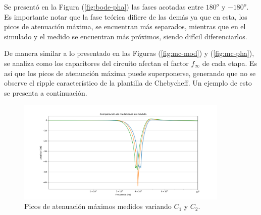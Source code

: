 Se presentó en la Figura (\ref{fig:bode-pha}) las fases acotadas entre $180^o$ y $-180^o$. Es importante notar que la fase teórica difiere de las demás ya que en esta, los picos de atenuación máxima, se encuentran más separados, mientras que en el simulado y el medido se encuentran más próximos, siendo difícil diferenciarlos. 

De manera similar a lo presentado en las Figuras (\ref{fig:mc-mod}) y (\ref{fig:mc-pha}), se analiza como los capacitores del circuito afectan el factor $f_\infty$ de cada etapa. Es así que los picos de atenuación máxima puede superponerse, generando que no se observe el ripple característico de la plantilla de Chebycheff. Un ejemplo de esto se presenta a continuación.
\begin{figure}[H]
\centering
	\includegraphics[width=0.9\textwidth]{ImagenesEjercicio4/Bode-Mod-2.png}
	\caption{Picos de atenuación máximos medidos variando $C_1$ y $C_2$.}
	\label{fig:picos}
\end{figure}

